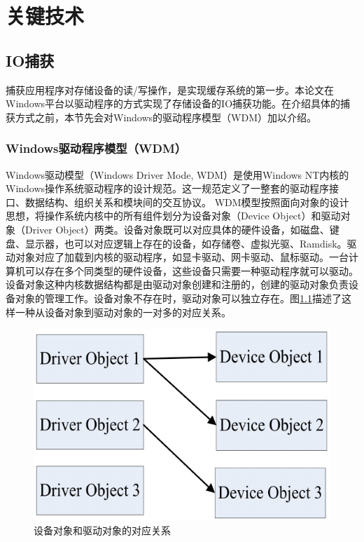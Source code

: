 
\chapter{关键技术}
\label{cha:key_tech}

\section{IO捕获}
\label{sec:capture_io}

捕获应用程序对存储设备的读/写操作，是实现缓存系统的第一步。本论文在Windows平台以驱动程序的方式实现了存储设备的IO捕获功能。在介绍具体的捕获方式之前，本节先会对Windows的驱动程序模型（WDM）加以介绍。

\subsection{Windows驱动程序模型（WDM）}
Windows驱动模型（Windows Driver Mode, WDM）是使用Windows NT内核的Windows操作系统驱动程序的设计规范。这一规范定义了一整套的驱动程序接口、数据结构、组织关系和模块间的交互协议。
WDM模型按照面向对象的设计思想，将操作系统内核中的所有组件划分为设备对象（Device Object）和驱动对象（Driver Object）两类。设备对象既可以对应具体的硬件设备，如磁盘、键盘、显示器，也可以对应逻辑上存在的设备，如存储卷、虚拟光驱、Ramdisk。驱动对象对应了加载到内核的驱动程序，如显卡驱动、网卡驱动、鼠标驱动。一台计算机可以存在多个同类型的硬件设备，这些设备只需要一种驱动程序就可以驱动。设备对象这种内核数据结构都是由驱动对象创建和注册的，创建的驱动对象负责设备对象的管理工作。设备对象不存在时，驱动对象可以独立存在。图\ref{fig:drv-to-dev}描述了这样一种从设备对象到驱动对象的一对多的对应关系。
\begin{figure}[htb]
\centering
\includegraphics[width=0.6\linewidth]{./graph/drv-to-dev}
\caption{设备对象和驱动对象的对应关系}
\label{fig:drv-to-dev}
\end{figure}

